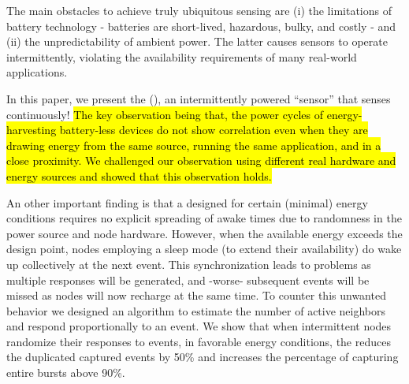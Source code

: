 The main obstacles to achieve truly ubiquitous sensing are (i) the limitations of battery technology - batteries are short-lived, hazardous, bulky, and costly - and (ii) the unpredictability of ambient power. The latter causes sensors to operate intermittently, violating the availability requirements of many real-world applications. 

In this paper, we present the \textit{\fullsys} (\sys), an intermittently powered ``sensor'' that senses continuously!
\hl{The key observation being that, the power cycles of energy-harvesting battery-less devices do not show correlation even when they are drawing energy from the same source, running the same application, and in a close proximity.
We challenged our observation using different real hardware and energy sources and showed that this observation holds.} 

An other important finding is that a \sys designed for certain (minimal) energy conditions requires no explicit spreading of awake times due to randomness in the power source and node hardware. However, when the available energy exceeds the design point, nodes employing a sleep mode (to extend their availability) do wake up collectively at the next event. This synchronization leads to problems as multiple responses will be generated, and -worse- subsequent events will be missed as nodes will now recharge at the same time.
To counter this unwanted behavior we designed an algorithm to estimate the number of active neighbors and respond proportionally to an event. 
We show that when intermittent nodes randomize their responses to events, in favorable energy conditions, the \sys reduces the duplicated captured events by 50\% and increases the percentage of capturing entire bursts above 90\%. 
